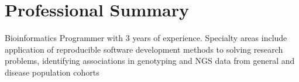 \documentclass{article}
\begin{document}


\section*{Professional Summary} \vspace{-1em} \hrulefill \vspace{.5em}

\noindent Bioinformatics Programmer with 3 years of experience. Specialty areas include application of reproducible
software development methods to solving research problems, identifying associations in genotyping and NGS data from 
general and disease population cohorts

\end{document}
